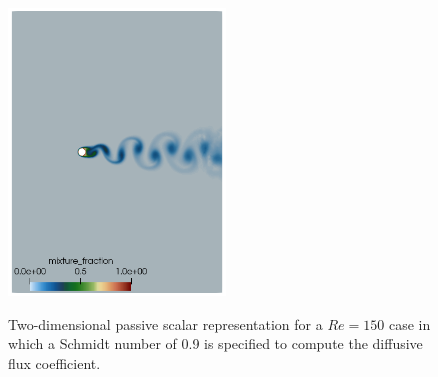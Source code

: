 \documentclass{article}
\begin{document}
\begin{figure}[!htbp]
  \centering
  {
   \includegraphics[height=3.0in]{images/vortexStreetR0.png}
  }
  \caption{Two-dimensional passive scalar representation for a $Re = 150$ case in which a Schmidt number of 0.9 is specified to
compute the diffusive flux coefficient.}
  \label{fig:passive_scalar}
\end{figure}
\end{document}
